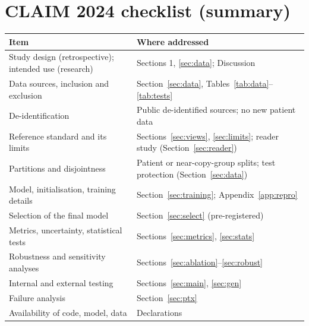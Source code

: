 \documentclass[11pt]{article}
\begin{document}
\section{CLAIM 2024 checklist (summary)}\label{app:claim}
\begin{center}\footnotesize
\begin{tabular}{p{7.5cm}p{6.5cm}}
\toprule
Item & Where addressed \\
\midrule
Study design (retrospective); intended use (research) & Sections 1, \ref{sec:data}; Discussion \\
Data sources, inclusion and exclusion & Section~\ref{sec:data}, Tables~\ref{tab:data}--\ref{tab:tests} \\
De-identification & Public de-identified sources; no new patient data \\
Reference standard and its limits & Sections~\ref{sec:views}, \ref{sec:limits}; reader study (Section~\ref{sec:reader}) \\
Partitions and disjointness & Patient or near-copy-group splits; test protection (Section~\ref{sec:data}) \\
Model, initialisation, training details & Section~\ref{sec:training}; Appendix~\ref{app:repro} \\
Selection of the final model & Section~\ref{sec:select} (pre-registered) \\
Metrics, uncertainty, statistical tests & Sections~\ref{sec:metrics}, \ref{sec:stats} \\
Robustness and sensitivity analyses & Sections~\ref{sec:ablation}--\ref{sec:robust} \\
Internal and external testing & Sections~\ref{sec:main}, \ref{sec:gen} \\
Failure analysis & Section~\ref{sec:ptx} \\
Availability of code, model, data & Declarations \\
\bottomrule
\end{tabular}
\end{center}
\end{document}

